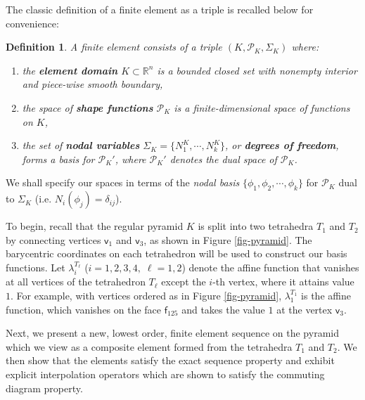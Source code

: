 \documentclass[twoside,reqno,final]{amsart}
\newcommand{\vt}{\mathsf{v}}
\newcommand{\fc}{\mathsf{f}}
\newcommand{\bR}{\mathbb R}
\newtheorem{definition}[theorem]{Definition}
\begin{document}
The classic definition of a finite element \cite{BrennerScott08,Ciarlet78}
as a triple is recalled below for convenience:
\begin{definition}
A finite element consists of a triple 
$(K, \mathcal{P}_K, \Sigma_K)$ where:
\begin{enumerate}
 \item the {\em \textbf{element domain}} $K\subset \bR^n$  is a bounded closed set with nonempty interior and piece-wise smooth boundary,
 \item the space of {\em\textbf{shape functions}} $\mathcal{P}_K$ 
 is a finite-dimensional space of functions on $K$,
 \item the set of {\em \textbf{nodal variables}} $\Sigma_K=\{N_1^K,\cdots, N_k^K\}$, or {\em \textbf{degrees of freedom}},  forms a basis for $\mathcal{P}_K'$, where $\mathcal{P}_K'$ denotes the dual space of $\mathcal{P}_K$.
\end{enumerate}
\end{definition}

We shall specify our spaces in terms of the {\it nodal basis}
$\{\phi_1,\phi_2,\cdots, \phi_k\}$ for $\mathcal{P}_K$ 
dual to $\Sigma_K$ (i.e. $N_i(\phi_j)= \delta_{ij}$).

To begin, 
recall that 
the regular pyramid $K$ is split into two tetrahedra $T_1$ and $T_2$  by connecting vertices $\vt_1$ and $\vt_3$, as shown in Figure \ref{fig-pyramid}. 
The barycentric coordinates on each tetrahedron will be used to construct our basis functions.
Let $\lambda_i^{T_\ell}$ ($i=1,2,3,4,\; \ell = 1,2$) denote the affine function that vanishes at 
all vertices of the tetrahedron $T_\ell$ except the $i$-th vertex, where it attains value $1$.
For example, with vertices ordered as in Figure \ref{fig-pyramid}, 
$\lambda_1^{T_1}$ is the affine function, which vanishes on the face $\fc_{125}$ and takes the value $1$ at 
the vertex $\vt_3$.

Next, we present a new, lowest order, finite element sequence on the pyramid which we view as a composite
element formed from the tetrahedra $T_1$ and $T_2$. We then show that the elements satisfy the  exact sequence 
property and exhibit explicit interpolation
operators which are shown to satisfy the commuting diagram property. 
\end{document}

